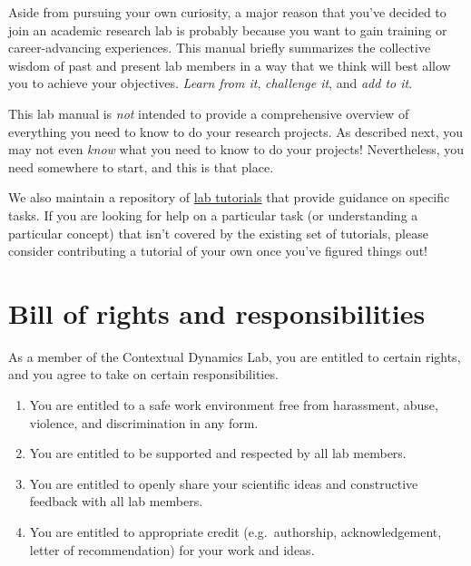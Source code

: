 \documentclass{tufte-book} %
\begin{document}
Aside from pursuing your own curiosity, a major reason that you've
decided to join an academic research lab is probably because you want
to gain training or career-advancing experiences.  This manual briefly
summarizes the collective wisdom of past and present lab members in a
way that we think will best allow you to achieve your objectives.
\textit{Learn from it}, \textit{challenge it}, and \textit{add to it}.


\noindent This lab manual is
\textit{not} intended to provide a comprehensive overview of
everything you need to know to do your research projects.  As
described next, you may not even \textit{know} what you need to know
to do your projects!  Nevertheless, you need somewhere to start, and
this is that place.

We also maintain a repository of
\href{https://github.com/ContextLab/CDL-tutorials}{lab tutorials} that
provide guidance on specific tasks.  If you are looking for help on a
particular task (or understanding a particular concept) that isn't
covered by the existing set of tutorials, please consider contributing
a tutorial of your own once you've figured things out!


\chapter{Bill of rights and responsibilities}\label{ch:billofrights}
As a member of the Contextual Dynamics Lab, you are entitled to
certain rights, and you agree to take on certain responsibilities.
\begin{enumerate}
\item You are entitled to a safe work environment free from
  harassment, abuse, violence, and discrimination in any form.
  \item You are entitled to be supported and respected by all lab
    members.
  \item You are entitled to openly share your scientific ideas and
    constructive feedback with all lab members.
  \item You are entitled to appropriate credit (e.g.\ authorship,
    acknowledgement, letter of recommendation) for your work and
    ideas.
\end{enumerate}
\end{document}

